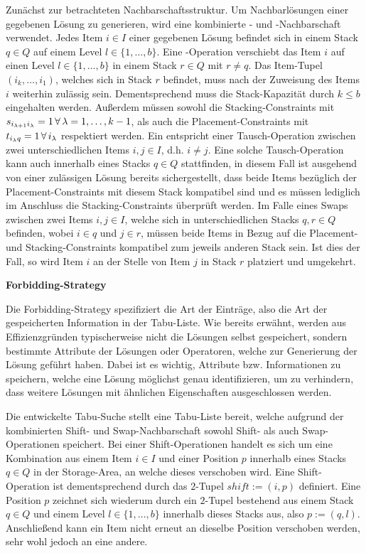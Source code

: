 Zunächst zur betrachteten Nachbarschaftsstruktur. Um Nachbarlösungen einer gegebenen Lösung zu generieren,
wird eine kombinierte - und -Nachbarschaft verwendet.
Jedes Item $i \in I$ einer gegebenen Lösung befindet sich in einem Stack $q \in Q$ auf einem Level $l \in \{1, \dotsc, b\}$.
Eine -Operation verschiebt das Item $i$ auf einen Level $l \in \{1, \dotsc, b\}$ in einem
Stack $r \in Q$ mit $r \neq q$. Das Item-Tupel $(i_k, \dotsc, i_1)$, welches sich in Stack $r$ befindet, muss nach der Zuweisung des Items $i$ weiterhin zulässig sein. Dementsprechend muss die Stack-Kapazität durch $k \leq b$ eingehalten werden.
Außerdem müssen sowohl die Stacking-Constraints mit $s_{i_{\lambda + 1}i_\lambda} = 1 \thinspace \forall \thinspace
\lambda = 1, \dotsc, k - 1$, als auch die Placement-Constraints mit $t_{i_\lambda q} = 1 \thinspace \forall
\thinspace i_\lambda$ respektiert werden.
Ein  entspricht einer Tausch-Operation zwischen zwei unterschiedlichen Items $i, j \in I$,
d.h. $i \neq j$. Eine solche Tausch-Operation kann auch innerhalb eines Stacks $q \in Q$ stattfinden,
in diesem Fall ist ausgehend von einer zulässigen Lösung bereits sichergestellt, dass beide Items bezüglich der Placement-Constraints mit diesem Stack kompatibel sind und es müssen lediglich im Anschluss die Stacking-Constraints überprüft werden. Im Falle eines Swaps zwischen zwei Items $i, j \in I$, welche sich in unterschiedlichen Stacks $q, r \in Q$ befinden, wobei $i \in q$ und $j \in r$, müssen beide Items in Bezug auf die Placement- und Stacking-Constraints kompatibel zum jeweils anderen Stack sein. Ist dies der Fall, so wird Item $i$ an der Stelle von Item $j$ in Stack $r$ platziert und umgekehrt.\newline

\textbf{Forbidding-Strategy}

Die Forbidding-Strategy spezifiziert die Art der Einträge, also die Art der gespeicherten Information in der
Tabu-Liste. Wie bereits erwähnt, werden aus Effizienzgründen typischerweise nicht die Lösungen selbst gespeichert,
sondern bestimmte Attribute der Lösungen oder Operatoren, welche zur Generierung der Lösung geführt haben.
Dabei ist es wichtig, Attribute bzw. Informationen zu speichern, welche eine Lösung möglichst genau identifizieren,
um zu verhindern, dass weitere Lösungen mit ähnlichen Eigenschaften ausgeschlossen werden.

\vfill
\pagebreak

Die entwickelte Tabu-Suche stellt eine Tabu-Liste bereit, welche aufgrund der kombinierten Shift- und Swap-Nachbarschaft
sowohl Shift- als auch Swap-Operationen speichert. Bei einer Shift-Operationen handelt es sich um eine Kombination aus einem Item
$i \in I$ und einer Position $p$ innerhalb eines Stacks $q \in Q$ in der Storage-Area, an welche dieses verschoben wird. Eine Shift-Operation ist dementsprechend durch das $2$-Tupel $shift := (i, p)$ definiert.
Eine Position $p$ zeichnet sich wiederum durch ein $2$-Tupel bestehend aus einem Stack $q \in Q$ und einem Level $l \in \{1, \dotsc, b\}$ innerhalb dieses Stacks aus, also $p := (q, l)$.
Anschließend kann ein Item nicht erneut an dieselbe Position verschoben werden, sehr wohl jedoch an eine andere.

